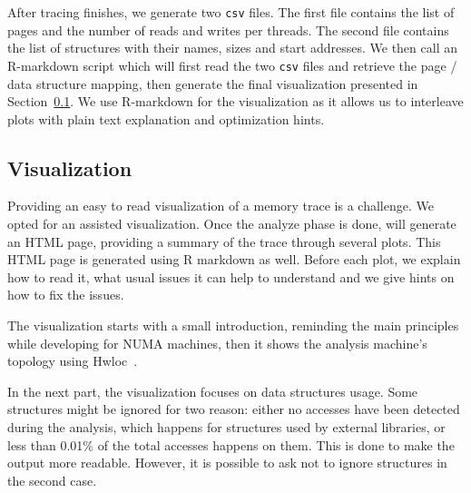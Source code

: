 After tracing finishes, we generate two \texttt{csv} files.
The first file contains the list of pages and the number of reads
and writes per threads. The second file contains the
list of structures with their names, sizes and start addresses.
We then call an R-markdown script which will first read the two \texttt{csv} files and
retrieve the page / data structure mapping, then generate the final
visualization presented in Section~\ref{sec:design-visu}. We use R-markdown
for the visualization as it allows us to interleave plots with plain text
explanation and optimization hints.


\subsection{Visualization}
\label{sec:design-visu}

Providing an easy to read visualization of a memory trace is a challenge. We opted for an
assisted visualization. Once the analyze phase is done, \TABARNAC will
generate an HTML page, providing a summary of the trace through several plots.
This HTML page is generated using R markdown as well.
Before each plot, we explain how to read it, what
usual issues it can help to understand and we give hints on how to fix the issues.

The visualization starts with a small introduction, reminding the main
principles while developing for NUMA machines, then it shows the analysis
machine's topology using Hwloc~\cite{Broquedis10hwloc}.

In the next part, the visualization focuses on data structures usage. Some structures might
be ignored for two reason: either no accesses have been detected during the
analysis, which happens for structures used by external libraries, or less than 0.01\% of the total accesses happens on them. This is done to make the output
more readable. However, it is possible to ask \TABARNAC not to ignore
structures in the second case.

